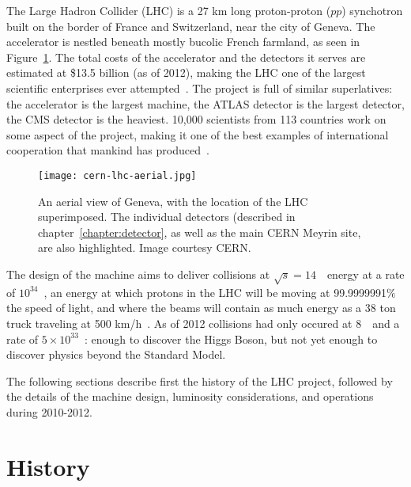 \label{chapter:lhc}

The Large Hadron Collider (LHC) is a 27 km long proton-proton ($pp$) synchotron built on the border of France and Switzerland, near the city of Geneva. The accelerator is nestled beneath mostly bucolic French farmland, as seen in Figure~\ref{fig:lhc:cern-lhc-aerial}. The total costs of the accelerator and the detectors it serves are estimated at \$13.5 billion (as of 2012), making the LHC one of the largest scientific enterprises ever attempted~\cite{LHCGuide,ForbesLHC}. The project is full of similar superlatives: the accelerator is the largest machine, the ATLAS detector is the largest detector, the CMS detector is the heaviest. 10,000 scientists from 113 countries work on some aspect of the project, making it one of the best examples of international cooperation that mankind has produced~\cite{LHCGuide}.


\begin{figure}
\centering
\texttt{[image: cern-lhc-aerial.jpg]}
\caption{An aerial view of Geneva, with the location of the LHC superimposed. The individual detectors (described in chapter~\ref{chapter:detector}, as well as the main CERN Meyrin site, are also highlighted. Image courtesy CERN.}
\label{fig:lhc:cern-lhc-aerial}
\end{figure}


The design of the machine aims to deliver collisions at $\sqrt{s} = 14$~\TeV~energy at a rate of $10^{34}$~\lumirate, an energy at which protons in the LHC will be moving at 99.9999991$\%$ the speed of light, and where the beams will contain as much energy as a 38 ton truck traveling at 500 km/h~\cite{LHCGuide}. As of 2012 collisions had only occured at 8~\TeV~and a rate of $5\times10^{33}$~\lumirate: enough to discover the Higgs Boson, but not yet enough to discover physics beyond the Standard Model.

The following sections describe first the history of the LHC project, followed by the details of the machine design, luminosity considerations, and operations during 2010-2012.

\section{History}
\label{lhc:history}

